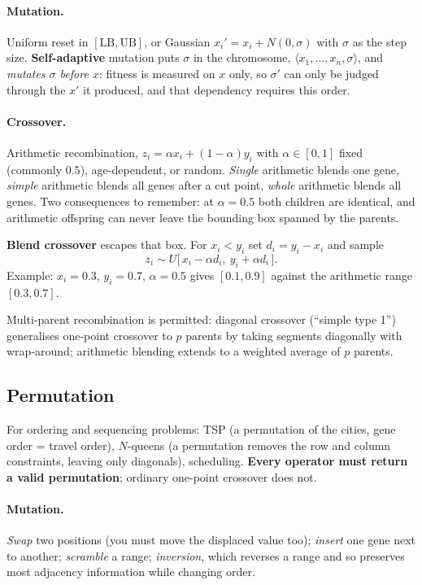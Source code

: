 \documentclass[11pt,a4paper]{article}
\begin{document}
\paragraph{Mutation.} Uniform reset in $[\mathrm{LB},\mathrm{UB}]$, or
Gaussian $x_i'=x_i+N(0,\sigma)$ with $\sigma$ as the step size.
\textbf{Self-adaptive} mutation puts $\sigma$ in the chromosome,
$\langle x_1,\ldots,x_n,\sigma\rangle$, and \emph{mutates $\sigma$ before
$x$}: fitness is measured on $x$ only, so $\sigma'$ can only be judged
through the $x'$ it produced, and that dependency requires this order.

\paragraph{Crossover.} Arithmetic recombination, $z_i=\alpha x_i+(1-\alpha)y_i$
with $\alpha\in[0,1]$ fixed (commonly $0.5$), age-dependent, or random.
\emph{Single} arithmetic blends one gene, \emph{simple} arithmetic blends all
genes after a cut point, \emph{whole} arithmetic blends all genes. Two
consequences to remember: at $\alpha=0.5$ both children are identical, and
arithmetic offspring can never leave the bounding box spanned by the parents.

\textbf{Blend crossover} escapes that box. For $x_i<y_i$ set $d_i=y_i-x_i$
and sample
\[
  z_i\sim U\bigl[\,x_i-\alpha d_i,\ y_i+\alpha d_i\,\bigr].
\]
Example: $x_i=0.3$, $y_i=0.7$, $\alpha=0.5$ gives $[0.1,0.9]$ against the
arithmetic range $[0.3,0.7]$.

Multi-parent recombination is permitted: diagonal crossover (``simple type
1'') generalises one-point crossover to $p$ parents by taking segments
diagonally with wrap-around; arithmetic blending extends to a weighted
average of $p$ parents.

\subsection{Permutation}

For ordering and sequencing problems: TSP (a permutation of the cities, gene
order = travel order), $N$-queens (a permutation removes the row and column
constraints, leaving only diagonals), scheduling. \textbf{Every operator must
return a valid permutation}; ordinary one-point crossover does not.

\paragraph{Mutation.} \emph{Swap} two positions (you must move the displaced
value too); \emph{insert} one gene next to another; \emph{scramble} a range;
\emph{inversion}, which reverses a range and so preserves most adjacency
information while changing order.
\end{document}
